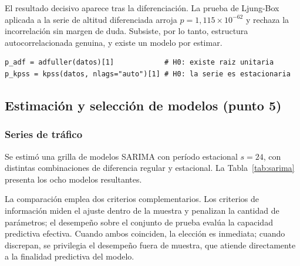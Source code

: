 El resultado decisivo aparece tras la diferenciación. La prueba de Ljung-Box aplicada a la
serie de altitud diferenciada arroja $p = 1{,}115 \times 10^{-62}$ y rechaza la incorrelación sin margen de duda. Subsiste, por lo tanto, estructura autocorrelacionada genuina, y
existe un modelo por estimar.

\begin{lstlisting}[caption={Aplicación conjunta de ambos contrastes}]
p_adf = adfuller(datos)[1]            # H0: existe raiz unitaria
p_kpss = kpss(datos, nlags="auto")[1] # H0: la serie es estacionaria
\end{lstlisting}

\subsection{Estimación y selección de modelos (punto 5)}

\subsubsection{Series de tráfico}

Se estimó una grilla de modelos SARIMA con período estacional $s = 24$, con distintas
combinaciones de diferencia regular y estacional. La Tabla~\ref{tab:sarima} presenta los ocho
modelos resultantes.

La comparación emplea dos criterios complementarios. Los criterios de información miden el
ajuste dentro de la muestra y penalizan la cantidad de parámetros; el desempeño sobre el
conjunto de prueba evalúa la capacidad predictiva efectiva. Cuando ambos coinciden, la elección es inmediata; cuando discrepan, se privilegia el desempeño fuera de muestra, que atiende directamente a la finalidad predictiva del modelo.

